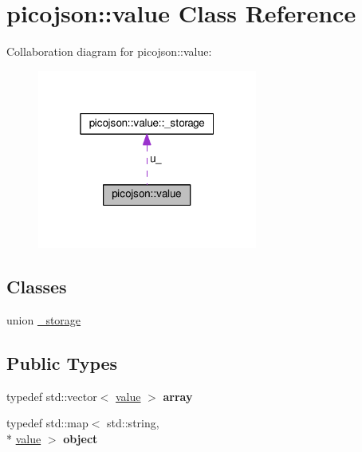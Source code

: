 \hypertarget{classpicojson_1_1value}{\section{picojson\+:\+:value Class Reference}
\label{classpicojson_1_1value}
}


Collaboration diagram for picojson\+:\+:value\+:\nopagebreak
\begin{figure}[H]
\begin{center}
\leavevmode
\includegraphics[width=205pt]{classpicojson_1_1value__coll__graph}
\end{center}
\end{figure}
\subsection*{Classes}
\begin{DoxyCompactItemize}
\item 
union \hyperlink{unionpicojson_1_1value_1_1__storage}{\+\_\+storage}
\end{DoxyCompactItemize}
\subsection*{Public Types}
\begin{DoxyCompactItemize}
\item 
\hypertarget{classpicojson_1_1value_adeff4fdf7ee5675eeb7686bb89233c43}{typedef std\+::vector$<$ \hyperlink{classpicojson_1_1value}{value} $>$ {\bfseries array}}\label{classpicojson_1_1value_adeff4fdf7ee5675eeb7686bb89233c43}

\item 
\hypertarget{classpicojson_1_1value_a7d7da11d54d7b983a902d28367bda9c1}{typedef std\+::map$<$ std\+::string, \\*
\hyperlink{classpicojson_1_1value}{value} $>$ {\bfseries object}}\label{classpicojson_1_1value_a7d7da11d54d7b983a902d28367bda9c1}

\end{DoxyCompactItemize}
